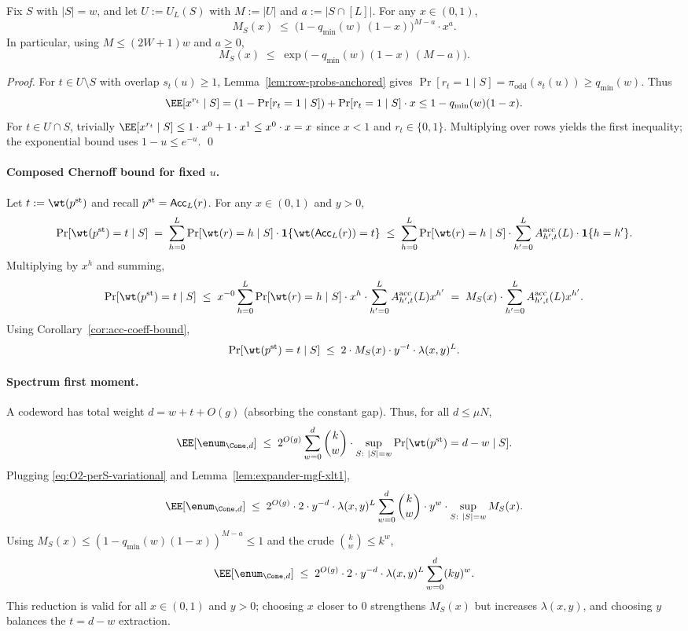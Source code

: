 \begin{lemma}
\label{lem:expander-mgf-xlt1}
Fix $S$ with $|S|=w$, and let $U:=U_L(S)$ with $M:=|U|$ and $a:=|S\cap[L]|$.
For any $x\in(0,1)$,
\[
M_S(x)
\;\le\;
\big(1-q_{\min}(w)\,(1-x)\big)^{M-a}\cdot x^{a}.
\]
In particular, using $M\le (2W+1)w$ and $a\ge 0$,
\[
M_S(x)\;\le\;\exp\!\big(-q_{\min}(w)(1-x)\,(M-a)\big).
\]
\end{lemma}

\begin{proof}
For $t\in U\setminus S$ with overlap $s_t(u)\ge 1$, Lemma~\ref{lem:row-probs-anchored} gives
$\Pr[r_t=1\mid S]=\pi_{\mathrm{odd}}(s_t(u))\ge q_{\min}(w)$.
Thus
\[
\EE[x^{r_t}\mid S]= (1-\Pr[r_t=1\mid S]) + \Pr[r_t=1\mid S]\cdot x
\le 1-q_{\min}(w)(1-x).
\]
For $t\in U\cap S$, trivially $\EE[x^{r_t}\mid S]\le 1\cdot x^0 + 1\cdot x^1 \le x^0\cdot x = x$ since $x<1$ and
$r_t\in\{0,1\}$.
Multiplying over rows yields the first inequality; the exponential bound uses $1-u\le e^{-u}$.
\qed
\end{proof}

\paragraph{Composed Chernoff bound for fixed $u$.}
Let $t:=\wt(p^{\mathrm{st}})$ and recall $p^{\mathrm{st}}={\sf Acc}_L(r)$.
For any $x\in(0,1)$ and $y>0$,
\[
\Pr[\wt(p^{\mathrm{st}})=t\mid S]
\;=\;
\sum_{h=0}^{L}\Pr[\wt(r)=h\mid S]\cdot \mathbf{1}\{\wt({\sf Acc}_L(r))=t\}
\;\le\;
\sum_{h=0}^{L}\Pr[\wt(r)=h\mid S]\cdot \sum_{h'=0}^{L}A^{\mathrm{acc}}_{h',t}(L)\cdot \mathbf{1}\{h=h'\}.
\]
Multiplying by $x^{h}$ and summing,
\[
\Pr[\wt(p^{\mathrm{st}})=t\mid S]
\;\le\;
x^{-0}\sum_{h=0}^{L}\Pr[\wt(r)=h\mid S]\cdot x^{h}\cdot \sum_{h'=0}^{L}A^{\mathrm{acc}}_{h',t}(L)x^{h'}
\;=\;
M_S(x)\cdot \sum_{h'=0}^{L}A^{\mathrm{acc}}_{h',t}(L)x^{h'}.
\]
Using Corollary~\ref{cor:acc-coeff-bound},
\begin{equation}
\Pr[\wt(p^{\mathrm{st}})=t\mid S]
\;\le\;
2\cdot M_S(x)\cdot y^{-t}\cdot \lambda(x,y)^{L}.
\label{eq:O2-perS-variational}
\end{equation}

\paragraph{Spectrum first moment.}
A codeword has total weight $d=w+t+O(g)$ (absorbing the constant gap).
Thus, for all $d\le \mu N$,
\[
\EE[\enum_{\Cone,d}]
\;\le\;
2^{O(g)}\sum_{w=0}^{d}\binom{k}{w}\cdot
\sup_{S:\ |S|=w}\Pr[\wt(p^{\mathrm{st}})=d-w\mid S].
\]
Plugging \eqref{eq:O2-perS-variational} and Lemma~\ref{lem:expander-mgf-xlt1},
\[
\EE[\enum_{\Cone,d}]
\;\le\;
2^{O(g)}\cdot 2\cdot y^{-d}\cdot \lambda(x,y)^{L}
\sum_{w=0}^{d}\binom{k}{w}\cdot y^{w}\cdot
\sup_{S:\ |S|=w} M_S(x).
\]
Using $M_S(x)\le (1-q_{\min}(w)(1-x))^{M-a}\le 1$ and the crude $\binom{k}{w}\le k^{w}$,
\[
\EE[\enum_{\Cone,d}]
\;\le\;
2^{O(g)}\cdot 2\cdot y^{-d}\cdot \lambda(x,y)^{L}
\sum_{w=0}^{d}(k y)^{w}.
\]
This reduction is valid for all $x\in(0,1)$ and $y>0$; choosing $x$ closer to $0$ strengthens $M_S(x)$ but increases
$\lambda(x,y)$, and choosing $y$ balances the $t=d-w$ extraction.

